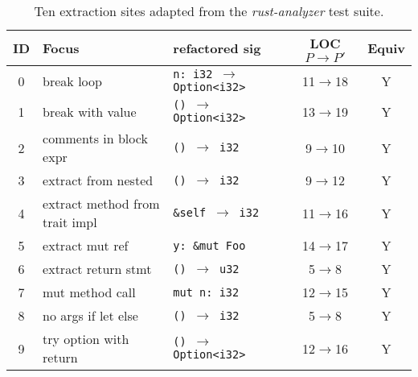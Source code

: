 \documentclass[format=sigplan,screen,10pt]{acmart}
\begin{document}
\vspace{-0.5\baselineskip}
\begin{table}[h]
\small
\setlength{\tabcolsep}{4pt}
\caption{Ten extraction sites adapted from the \textit{rust-analyzer} test suite.}

\label{tab:rem-results}
    \begin{tabularx}{\linewidth}{@{}c
      >{\raggedright\arraybackslash}X
      >{\ttfamily\raggedright\arraybackslash}X
      c
      c@{}}
    \toprule
    ID & Focus & refactored sig & LOC $P\rightarrow P'$ & Equiv \\
    \midrule
    0 & break loop & \texttt{n: i32 $\rightarrow$ Option<i32>} & 11$\rightarrow$18 & Y\\
    1 & break with value & \texttt{() $\rightarrow$ Option<i32>} & 13$\rightarrow$19 & Y\\
    2 & comments in block expr & \texttt{() $\rightarrow$ i32} & 9$\rightarrow$10 & Y\\
    3 & extract from nested & \texttt{() $\rightarrow$ i32} & 9$\rightarrow$12 & Y\\
    4 & extract method from trait impl & \texttt{\&self $\rightarrow$ i32} & 11$\rightarrow$16 & Y\\
    5 & extract mut ref & \texttt{y: \&mut Foo} & 14$\rightarrow$17 & Y\\
    6 & extract return stmt & \texttt{() $\rightarrow$ u32} & 5$\rightarrow$8 & Y\\
    7 & mut method call & \texttt{mut n: i32} & 12$\rightarrow$15 & Y\\
    8 & no args if let else & \texttt{() $\rightarrow$ i32} & 5$\rightarrow$8 & Y\\
    9 & try option with return & \texttt{() $\rightarrow$ Option<i32>} & 12$\rightarrow$16 & Y\\
    \bottomrule
    \end{tabularx}
\end{table}

\end{document}
